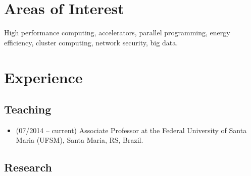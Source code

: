 \documentclass[11pt,a4paper]{article}
\begin{document}
\section{Areas of Interest} 

High performance computing, accelerators, parallel programming, energy efficiency, cluster computing, network security, big data.

\section{Experience}

\subsection{Teaching}

\begin{itemize}  \itemsep -2pt %
\item (07/2014 -- current) Associate Professor at the Federal University
of Santa Maria (UFSM), Santa Maria, RS, Brazil.
\end{itemize}

\subsection{Research}
\end{document}
